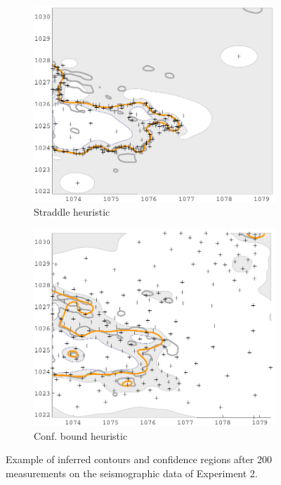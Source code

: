 \documentclass[11pt]{article} %
\begin{document}
\begin{figure}[tb]
  \begin{subfigure}[b]{0.5\textwidth}
    \centering
    \includegraphics[width=\textwidth]{figures/quake_expl_straddle}
    \caption{Straddle heuristic}
  \end{subfigure}
  \hfill
  \begin{subfigure}[b]{0.5\textwidth}
    \centering
    \includegraphics[width=\textwidth]{figures/quake_expl_cb}
    \caption{Conf. bound heuristic}
  \end{subfigure}
  \caption{Example of inferred contours and confidence regions after 200
           measurements on the seismographic data of Experiment 2.}
  \label{fig:quake_expl}
\end{figure}
\end{document}
